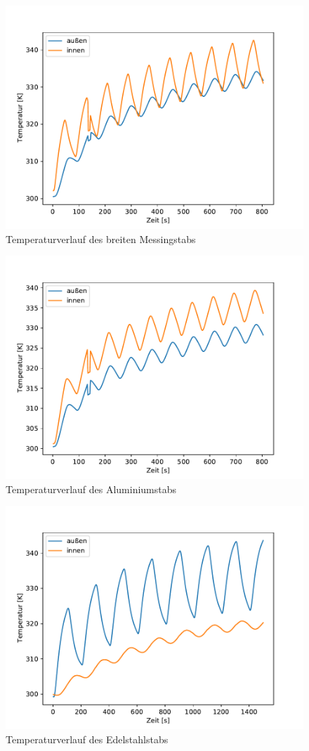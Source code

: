 \begin{figure}[!htbp]
  \centering
  \includegraphics{dyn_80_mess.pdf}
  \caption{Temperaturverlauf des breiten Messingstabs}
  \label{fig:mess_dyn}
\end{figure}

\begin{figure}[!htbp]
  \centering
  \includegraphics{dyn_80_alu.pdf}
  \caption{Temperaturverlauf des Aluminiumstabs}
  \label{fig:alu_dyn}
\end{figure}

\begin{figure}[!htbp]
  \centering
  \includegraphics{dyn_2.pdf}
  \caption{Temperaturverlauf des Edelstahlstabs}
  \label{fig:edel_dyn}
\end{figure}



